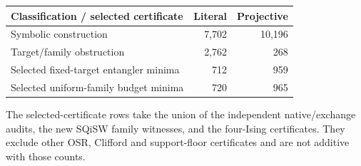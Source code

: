 \begin{center}\begin{tabular}{lrr}\toprule
Classification / selected certificate & Literal & Projective\\\midrule
Symbolic construction & 7,702 & 10,196\\
Target/family obstruction & 2,762 & 268\\
\midrule
Selected fixed-target entangler minima & 712 & 959\\
Selected uniform-family budget minima & 720 & 965\\
\bottomrule\end{tabular}\end{center}
The selected-certificate rows take the union of the independent native/exchange audits, the new SQiSW family witnesses, and the four-Ising certificates. They exclude other OSR, Clifford and support-floor certificates and are not additive with those counts.
